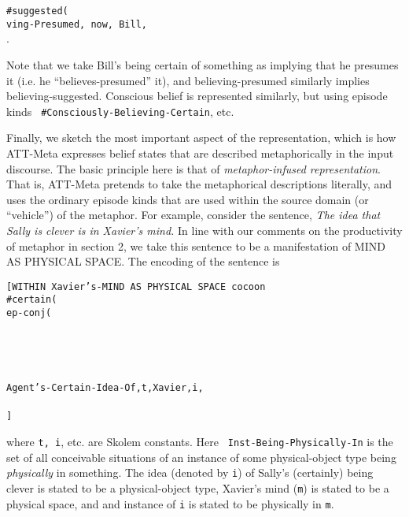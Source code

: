 \begin{tabbing}
{\tt \#suggested(}\\
\={\tt ving-Presumed, now, Bill,}\\
                        .
\end{tabbing}

Note that we take Bill's being certain of something as implying that he
presumes it (i.e. he ``believes-presumed'' it), and believing-presumed
similarly implies believing-suggested.  Conscious belief is represented
similarly, but using episode kinds {\tt
\#Consciously-Believing-Certain}, etc.

Finally, we sketch the most important aspect of the representation, which is
how ATT-Meta expresses belief states that are described metaphorically in the
input discourse. The basic principle here is that of {\it metaphor-infused
representation}. That is, ATT-Meta pretends to take the metaphorical descriptions
literally, and uses the ordinary episode kinds that are used within the
source domain (or ``vehicle'') of the metaphor. For example, consider the
sentence, {\it The idea that Sally is clever is in Xavier's mind.} In line with
our comments on the productivity of metaphor in section 2, we take this sentence
to be a manifestation of MIND AS PHYSICAL SPACE.  The encoding of the sentence is

\begin{tabbing}
{\tt [WITHIN Xavier's-MIND AS PHYSICAL SPACE cocoon}\\
{\tt \#certain(}\\
\quad {\tt \#}\={\tt ep-conj(}\\
              \\
              \\
              \\
              \\
              \={\tt Agent's-Certain-Idea-Of,t,Xavier,i,}\\
              \>                 \\
{\tt ]}
\end{tabbing}

\noindent
where {\tt t, i}, etc. are Skolem constants.  Here {\tt
Inst-Being-Physically-In} is the set of all conceivable situations of an
instance of some physical-object type being {\it physically} in something.  The
idea (denoted by {\tt i}) of Sally's (certainly) being clever is stated to be a
physical-object type, Xavier's mind ({\tt m}) is stated to be a physical space,
and and instance of {\tt i} is stated to be physically in {\tt m}.

